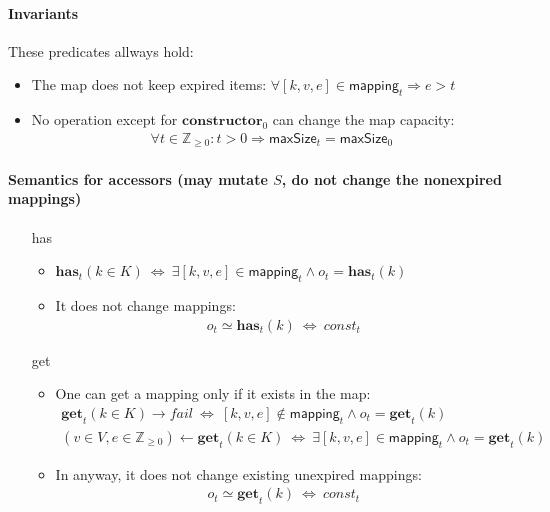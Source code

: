 \documentclass{article}
\renewcommand{\o}[1]{\ensuremath{\mathbf{#1}}}
\newcommand{\p}[1]{\ensuremath{\mathit{#1}}}
\newcommand{\s}[1]{\ensuremath{\mathsf{#1}}}
\newcommand{\nintset}{\ensuremath{\mathds{Z}_{\ge 0}}}
\begin{document}
\paragraph{Invariants}
These predicates allways hold:
\begin{itemize}
\item The map does not keep expired items: $\forall [k, v, e] \in \s{mapping}_t \Rightarrow e > t$
\item No operation except for $\o{constructor}_0$ can change the map capacity:
  \begin{gather*}
    \forall t\in \nintset: t > 0 \Rightarrow \s{maxSize}_t=\s{maxSize}_0
  \end{gather*}
\end{itemize}

\paragraph{Semantics for accessors (may mutate $S$, do not change the nonexpired mappings)}
\begin{itemize}
\item[has]
  \begin{itemize}
  \item $\o{has}_t(k \in K) ~\Leftrightarrow~ \exists [k,v,e] \in \s{mapping}_t \wedge o_t=\o{has}_t(k)$\\
  \item It does not change mappings:
    \begin{gather*}
      o_t \simeq \o{has}_t(k) ~\Leftrightarrow~ \p{const}_t
    \end{gather*}
  \end{itemize}
\item[get]
  \begin{itemize}
  \item One can get a mapping only if it exists in the map:
      \begin{gather}
        \o{get}_t(k \in K) \rightarrow fail ~\Leftrightarrow~ [k,v,e] \not\in \s{mapping}_t \wedge o_t=\o{get}_t(k)\label{eq:get1}\\
        (v\in V,e\in \nintset)\gets \o{get}_t(k \in K) ~\Leftrightarrow~ \exists [k,v,e] \in \s{mapping}_t \wedge o_t=\o{get}_t(k) \label{eq:get2}
      \end{gather}
  \item In anyway, it does not change existing unexpired mappings:
    \begin{gather*}
      o_t \simeq \o{get}_t(k) ~\Leftrightarrow~ \p{const}_t
    \end{gather*}
  \end{itemize}
\end{itemize}
\end{document}
